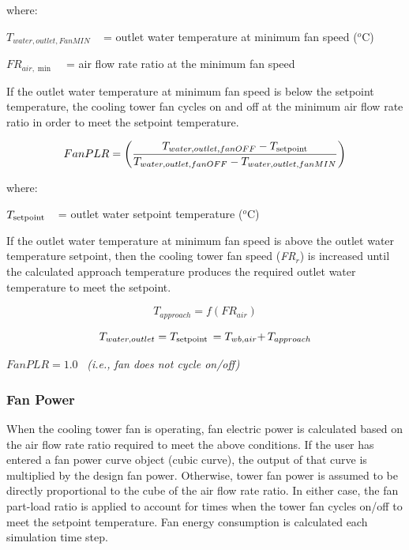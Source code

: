 where:

\({T_{water,outlet,FanMIN}}\) ~ = outlet water temperature at minimum fan speed (\(^{o}\)C)

\(F{R_{air,\min }}\) ~ = air flow rate ratio at the minimum fan speed

If the outlet water temperature at minimum fan speed is below the setpoint temperature, the cooling tower fan cycles on and off at the minimum air flow rate ratio in order to meet the setpoint temperature.

\begin{equation}
FanPLR = \left( {\frac{{{T_{water,outlet,fanOFF}} - {T_{{\rm{setpoint}}}}}}{{{T_{water,outlet,fanOFF}} - {T_{water,outlet,fanMIN}}}}} \right)
\end{equation}

where:

\({T_{{\rm{setpoint}}}}\) ~ = outlet water setpoint temperature (\(^{o}\)C)

If the outlet water temperature at minimum fan speed is above the outlet water temperature setpoint, then the cooling tower fan speed (\emph{FR\(_{r}\)}) is increased until the calculated approach temperature produces the required outlet water temperature to meet the setpoint.

\begin{equation}
{T_{approach}} = f\left( {F{R_{air}}} \right)
\end{equation}

\begin{equation}
{T_{water,outlet}} = {T_{{\rm{setpoint}}}}\, = {T_{wb,air}}{\rm{ + }}\,{T_{approach}}
\end{equation}

\(FanPLR = 1.0\) ~\emph{(i.e., fan does not cycle on/off)}

\subsubsection{Fan Power}\label{fan-power}

When the cooling tower fan is operating, fan electric power is calculated based on the air flow rate ratio required to meet the above conditions. If the user has entered a fan power curve object (cubic curve), the output of that curve is multiplied by the design fan power. Otherwise, tower fan power is assumed to be directly proportional to the cube of the air flow rate ratio. In either case, the fan part-load ratio is applied to account for times when the tower fan cycles on/off to meet the setpoint temperature. Fan energy consumption is calculated each simulation time step.

